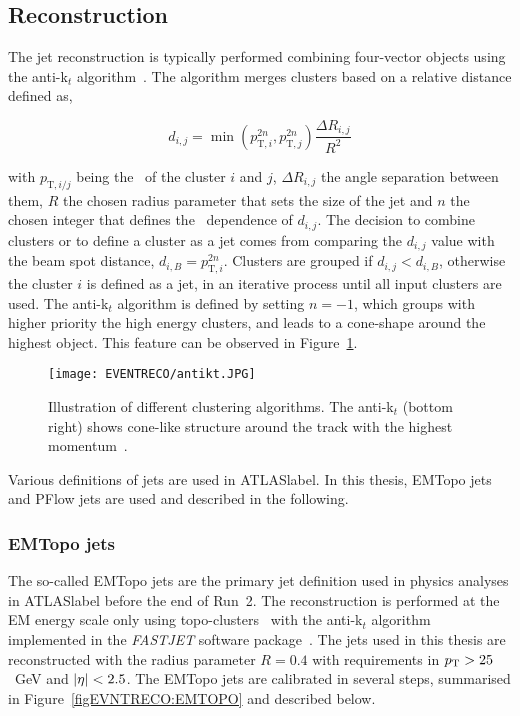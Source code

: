 \subsection{Reconstruction}

The jet reconstruction is typically performed combining four-vector objects using the anti-k$_t$ algorithm~\cite{Cacciari_2008}. The algorithm merges clusters based on a relative distance defined as,

\begin{equation}
    d_{i,j} = \min (p_{\text{T},i}^{2n},p_{\text{T},j}^{2n}) \frac{\Delta R_{i,j}}{R^2}
\end{equation}

with $p_{\text{T},i/j}$ being the \pT\ of the cluster $i$ and $j$, $\Delta R_{i,j}$ the angle separation between them, $R$ the chosen radius parameter that sets the size of the jet and $n$ the chosen integer that defines the \pT\ dependence of $d_{i,j}$. The decision to combine clusters or to define a cluster as a jet comes from comparing the $d_{i,j}$ value with the beam spot distance, $d_{i,B} = p_{\text{T},i}^{2n}$. Clusters are grouped if $d_{i,j} < d_{i,B}$, otherwise the cluster $i$ is defined as a jet, in an iterative process until all input clusters are used. The anti-k$_t$ algorithm is defined by setting $n=-1$, which groups with higher priority the high energy clusters, and leads to a cone-shape around the highest object. This feature can be observed in Figure~\ref{figEVNTRECO:antikt}.\\

\begin{figure}[htbp]
    \RawFloats
    \begin{center}
    \texttt{[image: EVENTRECO/antikt.JPG]}
    \caption{
        Illustration of different clustering algorithms. The anti-k$_t$ (bottom right) shows cone-like structure around the track with the highest momentum~\cite{Cacciari_2008}. 
    }
    \label{figEVNTRECO:antikt}
    \end{center}
\end{figure}

Various definitions of jets are used in \acrshort{ATLASlabel}. In this thesis, EMTopo jets and PFlow jets are used and described in the following.

\subsubsection{EMTopo jets}

The so-called EMTopo jets are the primary jet definition used in physics analyses in \acrshort{ATLASlabel} before the end of Run~2. The reconstruction is performed at the EM energy scale only using topo-clusters~\cite{PhysRevD.96.072002} with the anti-k$_t$ algorithm implemented in the \textit{FASTJET} software package~\cite{Cacciari2012}. The jets used in this thesis are reconstructed with the radius parameter $R = 0.4$ with requirements in $p_{\text{T}} > 25$~GeV and $\abs{\eta} < 2.5$. The EMTopo jets are calibrated in several steps, summarised in Figure~\ref{figEVNTRECO:EMTOPO} and described below.\\

